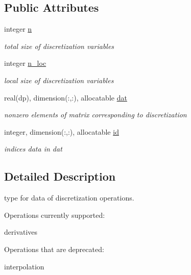 \subsection*{Public Attributes}
\begin{DoxyCompactItemize}
\item 
integer \hyperlink{structgrid__vars_1_1disc__type_a02a361f0c40f951f55e4fe7f4536d486}{n}
\begin{DoxyCompactList}\small\item\em total size of discretization variables \end{DoxyCompactList}\item 
integer \hyperlink{structgrid__vars_1_1disc__type_a8a79e0de23bef450fdacc3f3c0efcf77}{n\+\_\+loc}
\begin{DoxyCompactList}\small\item\em local size of discretization variables \end{DoxyCompactList}\item 
real(dp), dimension(\+:,\+:), allocatable \hyperlink{structgrid__vars_1_1disc__type_a8cc470f7c9721b8498e8e48f514ffff5}{dat}
\begin{DoxyCompactList}\small\item\em nonzero elements of matrix corresponding to discretization \end{DoxyCompactList}\item 
integer, dimension(\+:,\+:), allocatable \hyperlink{structgrid__vars_1_1disc__type_a7a69f7d82680ffe0d04166cebee24fb5}{id}
\begin{DoxyCompactList}\small\item\em indices data in {\ttfamily dat} \end{DoxyCompactList}\end{DoxyCompactItemize}


\subsection{Detailed Description}
type for data of discretization operations. 

Operations currently supported\+:
\begin{DoxyItemize}
\item derivatives
\end{DoxyItemize}

Operations that are deprecated\+:
\begin{DoxyItemize}
\item interpolation
\end{DoxyItemize}

